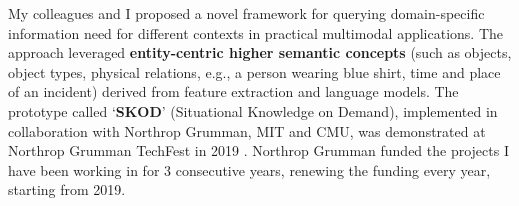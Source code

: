 My colleagues and I proposed a novel framework 
for querying domain-specific information need
for different contexts in practical multimodal applications. 
The approach leveraged \textbf{entity-centric higher semantic concepts} (such as objects, object
types, physical relations, e.g., a person wearing blue shirt, time and place of  an incident) derived from 
feature extraction and language models. 
%
The prototype called `\textbf{SKOD}' (Situational Knowledge on Demand), implemented in collaboration with Northrop Grumman, MIT and CMU, was demonstrated at Northrop Grumman TechFest in 2019 \cite{palacios2019wip}. Northrop Grumman
funded the projects I have been working in for 3 consecutive years, renewing the funding every year, starting from 2019.

